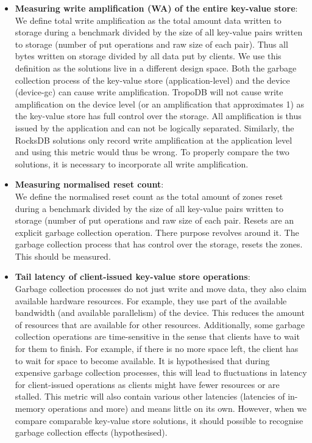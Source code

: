 \begin{itemize}
    \item \textbf{Measuring write amplification (WA) of the entire key-value store}:\\ 
    We define total write amplification as the total amount data written to storage during a benchmark divided by the size of all key-value pairs written to storage (number of put operations and raw size of each pair). Thus all bytes written on storage divided by all data put by clients. We use this definition as the solutions live in a different design space. Both the garbage collection process of the key-value store (application-level) and the device (device-gc) can cause write amplification. TropoDB will not cause write amplification on the device level (or an amplification that approximates 1) as the key-value store has full control over the storage. All amplification is thus issued by the application and can not be logically separated.  Similarly, the RocksDB solutions only record write amplification at the application level and using this metric would thus be wrong. To properly compare the two solutions, it is necessary to incorporate all write amplification. 
    \item \textbf{Measuring normalised reset count}:\\
    We define the normalised reset count as the total amount of zones reset during a benchmark divided by the size of all key-value pairs written to storage (number of put operations and raw size of each pair. Resets are an explicit garbage collection operation. There purpose revolves around it. The garbage collection process that has control over the storage, resets the zones. This should be measured.
    \item \textbf{Tail latency of client-issued key-value store operations}:\\
    Garbage collection processes do not just write and move data, they also claim available hardware resources. For example, they use part of the available bandwidth (and available parallelism) of the device. This reduces the amount of resources that are available for other resources. Additionally, some garbage collection operations are time-sensitive in the sense that clients have to wait for them to finish. For example, if there is no more space left, the client has to wait for space to become available. It is hypothesised that during expensive garbage collection processes, this will lead to fluctuations in latency for client-issued operations as clients might have fewer resources or are stalled. This metric will also contain various other latencies (latencies of in-memory operations and more) and means little on its own. However, when we compare comparable key-value store solutions, it should possible to recognise garbage collection effects (hypothesised).  
\end{itemize}

